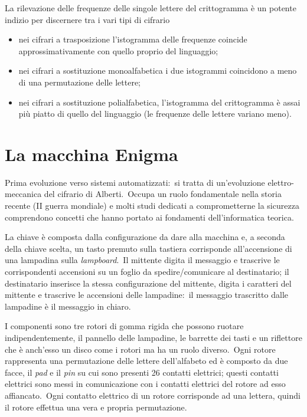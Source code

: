 La rilevazione delle frequenze delle singole lettere del crittogramma è un potente indizio per discernere tra i vari tipi di cifrario

\begin{itemize}
    \item nei cifrari a trasposizione l'istogramma delle frequenze coincide approssimativamente con quello proprio del linguaggio;
    \item nei cifrari a sostituzione monoalfabetica i due istogrammi coincidono a meno di una permutazione delle lettere;
    \item nei cifrari a sostituzione polialfabetica, l'istogramma del crittogramma è assai più piatto di quello del linguaggio (le frequenze delle lettere variano meno).
\end{itemize}

\section{La macchina Enigma}

Prima evoluzione verso sistemi automatizzati:\ si tratta di un'evoluzione elet\-tro-meccanica del cifrario di Alberti.\
Occupa un ruolo fondamentale nella storia recente (II guerra mondiale) e molti studi dedicati a comprometterne la sicurezza comprendono concetti che hanno portato ai fondamenti dell'informatica teorica.\

La chiave è composta dalla configurazione da dare alla macchina e, a seconda della chiave scelta, un tasto premuto sulla tastiera corrisponde all'accensione di una lampadina sulla \textit{lampboard}.\
Il mittente digita il messaggio e trascrive le corrispondenti accensioni su un foglio da spedire/comunicare al destinatario; il destinatario inserisce la stessa configurazione del mittente, digita i caratteri del mittente e trascrive le accensioni delle lampadine:\ il messaggio trascritto dalle lampadine è il messaggio in chiaro.\

I componenti sono tre rotori di gomma rigida che possono ruotare indipendentemente, il pannello delle lampadine, le barrette dei tasti e un riflettore che è anch'esso un disco come i rotori ma ha un ruolo diverso.\
Ogni rotore rappresenta una permutazione delle lettere dell'alfabeto ed è composto da due facce, il \textit{pad} e il \textit{pin} su cui sono presenti 26 contatti elettrici; questi contatti elettrici sono messi in comunicazione con i contatti elettrici del rotore ad esso affiancato.\
Ogni contatto elettrico di un rotore corrisponde ad una lettera, quindi il rotore effettua una vera e propria permutazione.\

